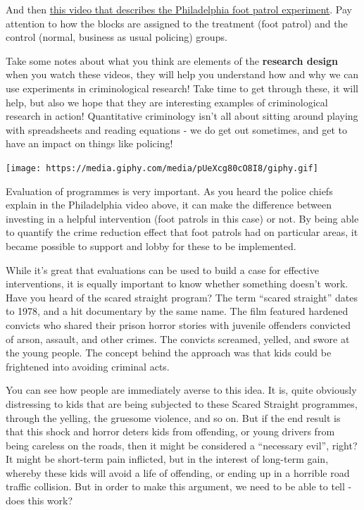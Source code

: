 \documentclass[
]{book}
\begin{document}
And then \href{https://www.youtube.com/watch?v=0NUQsK0vnnM}{this video that describes the Philadelphia foot patrol experiment}. Pay attention to how the blocks are assigned to the treatment (foot patrol) and the control (normal, business as usual policing) groups.

Take some notes about what you think are elements of the \textbf{research design} when you watch these videos, they will help you understand how and why we can use experiments in criminological research! Take time to get through these, it will help, but also we hope that they are interesting examples of criminological research in action! Quantitative criminology isn't all about sitting around playing with spreadsheets and reading equations - we do get out sometimes, and get to have an impact on things like policing!

\texttt{[image: https://media.giphy.com/media/pUeXcg80cO8I8/giphy.gif]}

Evaluation of programmes is very important. As you heard the police chiefs explain in the Philadelphia video above, it can make the difference between investing in a helpful intervention (foot patrols in this case) or not. By being able to quantify the crime reduction effect that foot patrols had on particular areas, it became possible to support and lobby for these to be implemented.

While it's great that evaluations can be used to build a case for effective interventions, it is equally important to know whether something doesn't work. Have you heard of the scared straight program? The term ``scared straight'' dates to 1978, and a hit documentary by the same name. The film featured hardened convicts who shared their prison horror stories with juvenile offenders convicted of arson, assault, and other crimes. The convicts screamed, yelled, and swore at the young people. The concept behind the approach was that kids could be frightened into avoiding criminal acts.

You can see how people are immediately averse to this idea. It is, quite obviously distressing to kids that are being subjected to these Scared Straight programmes, through the yelling, the gruesome violence, and so on. But if the end result is that this shock and horror deters kids from offending, or young drivers from being careless on the roads, then it might be considered a ``necessary evil'', right? It might be short-term pain inflicted, but in the interest of long-term gain, whereby these kids will avoid a life of offending, or ending up in a horrible road traffic collision. But in order to make this argument, we need to be able to tell - does this work?
\end{document}

